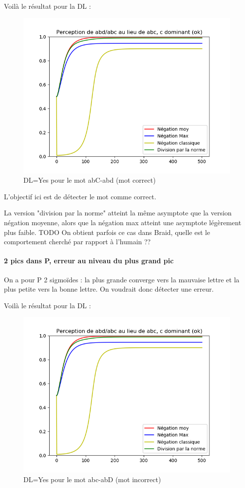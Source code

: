 \documentclass{article}
\begin{document}
Voilà le résultat pour la DL :

\begin{figure}[H]
\centering
	\includegraphics[scale=0.6]{abC_abd.png}
	\caption{DL=Yes pour le mot abC-abd (mot correct)}
\end{figure} 


L'objectif ici est de détecter le mot comme correct.

La version "division par la norme" atteint la même asymptote que la version négation moyenne, alors que la négation max atteint une asymptote légèrement plus faible.
TODO On obtient parfois ce cas dans Braid, quelle est le comportement cherché par rapport à l'humain ??
    
\paragraph{2 pics dans P, erreur au niveau du plus grand pic}
On a pour P 2 sigmoïdes : la plus grande converge vers la mauvaise lettre et la plus petite vers la bonne lettre. On voudrait donc détecter une erreur.

Voilà le résultat pour la DL :

\begin{figure}[H]
\centering
	\includegraphics[scale=0.6]{abC_abd.png}
	\caption{DL=Yes pour le mot abc-abD (mot incorrect)}
\end{figure} 
\end{document}
